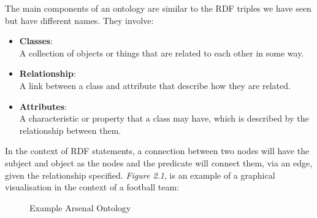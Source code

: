 The main components of an ontology are similar to the RDF triples we have seen but have different names. They involve:

\vspace{-0.15cm}
\begin{itemize}
    \itemsep0em 
\item \textbf{Classes}: \\
A collection of objects or things that are related to each other in some way.

\item \textbf{Relationship}: \\
A link between a class and attribute that describe how they are related. 

\item \textbf{Attributes}:\\ 
A characteristic or property that a class may have, which is described by the relationship between them.

\end{itemize}
\vspace{-0.15cm}

In the context of RDF statements, a connection between two nodes will have the subject and object as the nodes and the predicate will connect them, via an edge, given the relationship specified. \textit{Figure 2.1}, is an example of a graphical visualisation in the context of a football team:

\begin{figure}
\begin{center}
\end{center}
\vspace{-0.2cm}
\caption{Example Arsenal Ontology}
\end{figure}
\vspace{-0.15cm}

